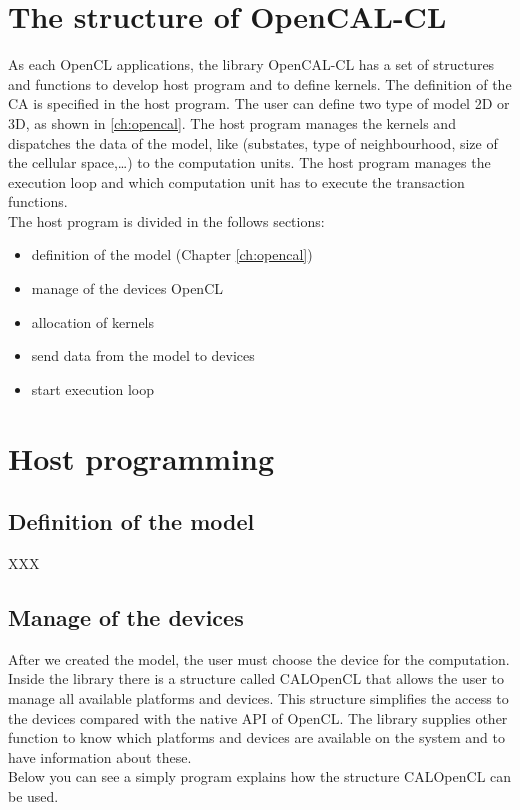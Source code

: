 \section{The structure of OpenCAL-CL}
As each OpenCL applications, the library OpenCAL-CL has a set of structures and
functions to develop host program and to define kernels. The definition of the
CA is specified in the host program. The user can define two type of model 2D or
3D, as shown in \ref{ch:opencal}. 
The host program manages the kernels and dispatches the data of the model, like (substates, type of neighbourhood, 
size of the cellular space,\ldots)
to the computation units.
The host program
manages the execution loop and which computation unit has to execute the
transaction functions. \\
The host program is divided in the follows sections:
\begin{itemize}
\item definition of the model (Chapter \ref{ch:opencal}) 
\item manage of the devices OpenCL
\item allocation of kernels
\item send data from the model to devices
\item start execution loop
\end{itemize}

\section{Host programming} 

\subsection{Definition of the model}

XXX

\subsection{Manage of the devices}

After we created the model, the user must choose the device for the computation.
Inside the library there is a structure called CALOpenCL that allows the user to manage all 
available platforms and devices.
This structure simplifies the access to the devices compared with the native API
of OpenCL. The library supplies other function to know which platforms and
devices are available on the system and to have information about these.\\
Below you can see a simply program explains how the structure
CALOpenCL can be used.


